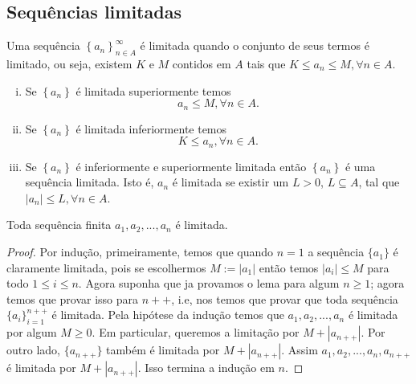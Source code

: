    \subsection{Sequências limitadas}
      \begin{definition}
         Uma sequência $\left\{a_{n}\right\}^{\infty}_{n \in A}$
         é limitada quando o conjunto de seus termos é limitado, 
         ou seja, existem $K$ e $M$ contidos em $A$ tais que 
         $K \leq a_{n} \leq M, \forall n \in A$.
         \begin{enumerate}[i.]
            \item Se $\left\{a_{n}\right\}$ é limitada superiormente 
               temos $$a_{n} \leq M,\forall n \in A.$$
            \item Se $\left\{a_{n}\right\}$ é limitada inferiormente 
               temos $$K \leq a_{n}, \forall n \in A.$$
            \item Se $\left\{a_{n}\right\}$ é inferiormente e superiormente
               limitada então $\left\{a_{n}\right\}$ é uma sequência limitada.
               Isto é, ${a_{n}}$ é limitada se existir um 
               $L > 0$, $L \subseteq A$, tal que 
               $|a_{n}| \leq L, \forall n \in A$.
         \end{enumerate}
      \end{definition}
      \begin{lemma}
         Toda sequência finita $a_{1},a_{2},...,a_{n}$ é limitada.
         \begin{proof}
            Por indução, primeiramente, temos que quando $n=1$ a 
            sequência $\{a_{1}\}$ é claramente limitada, pois se 
            escolhermos $M := |a_{1}|$ então temos 
            $|a_{i}| \leq M$ para todo $1 \leq i \leq n$. Agora 
            suponha que ja provamos o lema para algum $n \geq 1$; 
            agora temos que provar isso para $n++$, i.e, nos temos 
            que provar que toda sequência $\{a_{i}\}^{n++}_{i=1}$ 
            é limitada. Pela hipótese da indução temos que 
            $a_{1},a_{2}, ...,a_{n}$ é limitada por algum $M \geq 0$.
            Em particular, queremos a limitação por 
            $M + |a_{n++}|$. Por outro lado, $\{a_{n++}\}$ 
            também é limitada por $M + |a_{n++}|$.
            Assim $a_{1},a_{2},...,a_{n},a_{n++}$ é limitada 
            por $M + |a_{n++}|$. Isso termina a indução em $n$.
         \end{proof}
      \end{lemma}
